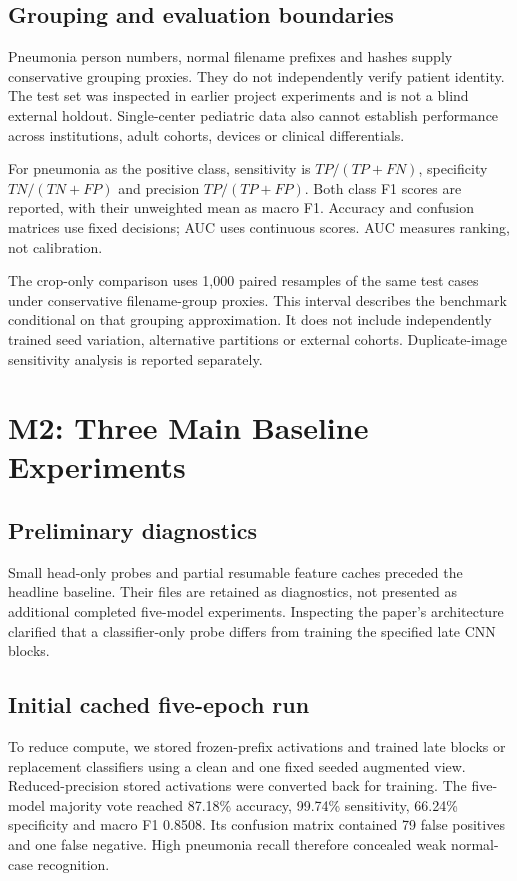 \documentclass[conference]{IEEEtran}
\begin{document}
\subsection{Grouping and evaluation boundaries}
Pneumonia person numbers, normal filename prefixes and hashes supply conservative grouping proxies. They do not independently verify patient identity. The test set was inspected in earlier project experiments and is not a blind external holdout. Single-center pediatric data also cannot establish performance across institutions, adult cohorts, devices or clinical differentials.

For pneumonia as the positive class, sensitivity is $TP/(TP+FN)$, specificity $TN/(TN+FP)$ and precision $TP/(TP+FP)$. Both class F1 scores are reported, with their unweighted mean as macro F1. Accuracy and confusion matrices use fixed decisions; AUC uses continuous scores. AUC measures ranking, not calibration.

The crop-only comparison uses 1,000 paired resamples of the same test cases under conservative filename-group proxies. This interval describes the benchmark conditional on that grouping approximation. It does not include independently trained seed variation, alternative partitions or external cohorts. Duplicate-image sensitivity analysis is reported separately.

\section{M2: Three Main Baseline Experiments}
\subsection{Preliminary diagnostics}
Small head-only probes and partial resumable feature caches preceded the headline baseline. Their files are retained as diagnostics, not presented as additional completed five-model experiments. Inspecting the paper's architecture clarified that a classifier-only probe differs from training the specified late CNN blocks.

\subsection{Initial cached five-epoch run}
To reduce compute, we stored frozen-prefix activations and trained late blocks or replacement classifiers using a clean and one fixed seeded augmented view. Reduced-precision stored activations were converted back for training. The five-model majority vote reached 87.18\% accuracy, 99.74\% sensitivity, 66.24\% specificity and macro F1 0.8508. Its confusion matrix contained 79 false positives and one false negative. High pneumonia recall therefore concealed weak normal-case recognition.
\end{document}
